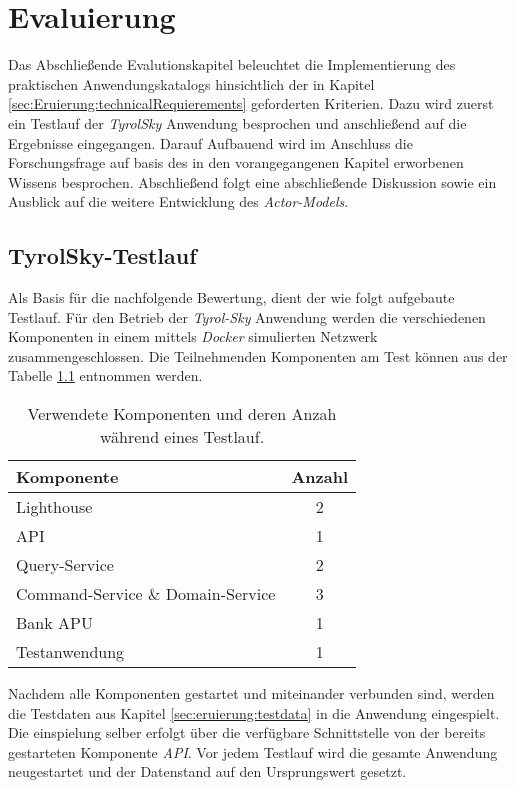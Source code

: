 \chapter{Evaluierung} \label{cha:evaluation}
Das Abschließende Evalutionskapitel beleuchtet die Implementierung des praktischen Anwendungskatalogs hinsichtlich der in Kapitel \ref{sec:Eruierung:technicalRequierements} geforderten Kriterien. Dazu wird zuerst ein Testlauf der \textit{TyrolSky} Anwendung besprochen und anschließend auf die Ergebnisse eingegangen. Darauf Aufbauend wird im Anschluss die Forschungsfrage auf basis des in den vorangegangenen Kapitel erworbenen Wissens besprochen. Abschließend folgt eine abschließende Diskussion sowie ein Ausblick auf die weitere Entwicklung des \textit{Actor-Models}. 

\section{TyrolSky-Testlauf}
Als Basis für die nachfolgende Bewertung, dient der wie folgt aufgebaute Testlauf. Für den Betrieb der \textit{Tyrol-Sky} Anwendung werden die verschiedenen Komponenten in einem mittels \textit{Docker} simulierten Netzwerk zusammengeschlossen. Die Teilnehmenden Komponenten am Test können aus der Tabelle \ref{tab:evaluation:testStage} entnommen werden. \\
\begin{table}
    \centering
    \begin{tabular}{lc}
        Komponente       &   Anzahl  \\ \hline
        Lighthouse       &   2       \\
        API              &   1       \\
        Query-Service    &   2       \\
        Command-Service \& Domain-Service  &   3       \\
        Bank APU         &   1       \\
        Testanwendung    &   1
    \end{tabular}
    \caption{Verwendete Komponenten und deren Anzah während eines Testlauf.}
    \label{tab:evaluation:testStage}
\end{table}
Nachdem alle Komponenten gestartet und miteinander verbunden sind, werden die Testdaten aus Kapitel \ref{sec:eruierung:testdata} in die Anwendung eingespielt. Die einspielung selber erfolgt über die verfügbare Schnittstelle von der bereits gestarteten Komponente \textit{API}. Vor jedem Testlauf wird die gesamte Anwendung neugestartet und der Datenstand auf den Ursprungswert gesetzt. \\

